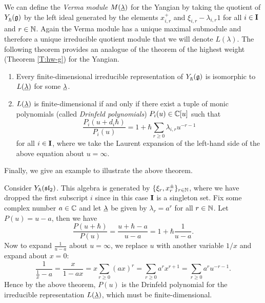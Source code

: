 We can define the \emph{Verma module} $M(\underline{\lambda})$ for the Yangian by taking the quotient of $Y_\hbar^{}(\mathfrak{g})$ by the left ideal generated by the elements $x^+_{i,r}$ and $\xi_{i,r}-\lambda_{i,r}1$ for all $i\in\mathbf{I}$ and $r\in\mathbb{N}$.
Again the Verma module has a unique maximal submodule and therefore a unique irreducible quotient module that we will denote $L(\lambda)$.
The following theorem provides an analogue of the theorem of the highest weight (Theorem \ref{T:hw-g}) for the Yangian.

\begin{theorem}\label{T:hw-Y}
    \begin{enumerate}
        \item Every finite-dimensional irreducible representation of $Y_\hbar^{}(\mathfrak{g})$ is isomorphic to $L(\underline{\lambda})$ for some $\underline{\lambda}$.
        \item $L(\underline{\lambda})$ is finite-dimensional if and only if there exist a tuple of monic polynomials (called \emph{Drinfeld polynomials}) $P_i(u)\in\mathbb{C}[u]$ such that
        \[\frac{P_i(u+d_i\hbar)}{P_i(u)} = 1+\hbar\sum_{r\geq 0}\lambda_{i,r}u^{-r-1}\]
        for all $i\in\mathbf{I}$, where we take the Laurent expansion of the left-hand side of the above equation about $u=\infty$.
    \end{enumerate}
\end{theorem}

Finally, we give an example to illustrate the above theorem.

\begin{example}\label{E:Y(sl2)}
    Consider $Y_\hbar(\mathfrak{sl}_2)$.
    This algebra is generated by $\{\xi_r,x^\pm_r\}_{r\in\mathbb{N}}$, where we have dropped the first subscript $i$ since in this case $\mathbf{I}$ is a singleton set.
    Fix some complex number $a\in\mathbb{C}$ and let $\underline{\lambda}$ be given by $\lambda_r=a^r$ for all $r\in\mathbb{N}$.
    Let $P(u)=u-a$, then we have
    \[\frac{P(u+\hbar)}{P(u)} = \frac{u+\hbar-a}{u-a} = 1+\hbar\frac{1}{u-a}.\]
    Now to expand $\frac{1}{u-a}$ about $u=\infty$, we replace $u$ with another variable $1/x$ and expand about $x=0$:
    \[\frac{1}{\frac{1}{x}-a} = \frac{x}{1-ax} = x\sum_{r\geq 0}(ax)^r = \sum_{r\geq 0}a^rx^{r+1} = \sum_{r\geq 0}a^ru^{-r-1}.\]
    Hence by the above theorem, $P(u)$ is the Drinfeld polynomial for the irreducible representation $L(\underline{\lambda})$, which must be finite-dimensional.
\end{example}

